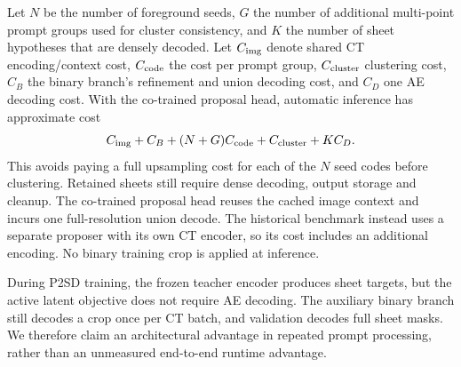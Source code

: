 Let $N$ be the number of foreground seeds, $G$ the number of additional
multi-point prompt groups used for cluster consistency, and $K$ the number
of sheet hypotheses that are densely decoded. Let $C_{\rm img}$ denote
shared CT encoding/context cost, $C_{\rm code}$ the cost per prompt group,
$C_{\rm cluster}$ clustering cost, $C_B$ the binary branch's refinement and
union decoding cost, and $C_D$ one AE decoding cost. With the co-trained
proposal head, automatic inference has approximate cost
\begin{equation}
 C_{\rm img}+C_B+(N+G)C_{\rm code}+C_{\rm cluster}+K C_D.
\end{equation}
This avoids paying a full upsampling cost for each of the $N$ seed codes
before clustering. Retained sheets still require dense decoding, output
storage and cleanup. The co-trained proposal head reuses the cached image
context and incurs one full-resolution union decode. The historical benchmark
instead uses a separate proposer with its own CT encoder, so its cost includes
an additional encoding. No binary training crop is applied at inference.

During P2SD training, the frozen teacher encoder produces sheet targets, but
the active latent objective does not require AE decoding. The auxiliary
binary branch still decodes a crop once per CT batch, and validation decodes
full sheet masks. We therefore claim an architectural advantage in repeated
prompt processing, rather than an unmeasured end-to-end runtime advantage.
